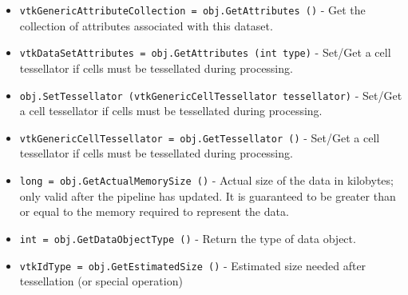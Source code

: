 \begin{itemize}
\item  \verb|vtkGenericAttributeCollection = obj.GetAttributes ()| -  Get the collection of attributes associated with this dataset.

\item  \verb|vtkDataSetAttributes = obj.GetAttributes (int type)| -  Set/Get a cell tessellator if cells must be tessellated during
 processing.
 

\item  \verb|obj.SetTessellator (vtkGenericCellTessellator tessellator)| -  Set/Get a cell tessellator if cells must be tessellated during
 processing.
 

\item  \verb|vtkGenericCellTessellator = obj.GetTessellator ()| -  Set/Get a cell tessellator if cells must be tessellated during
 processing.
 

\item  \verb|long = obj.GetActualMemorySize ()| -  Actual size of the data in kilobytes; only valid after the pipeline has
 updated. It is guaranteed to be greater than or equal to the memory
 required to represent the data.

\item  \verb|int = obj.GetDataObjectType ()| -  Return the type of data object.

\item  \verb|vtkIdType = obj.GetEstimatedSize ()| -  Estimated size needed after tessellation (or special operation)

\end{itemize}
